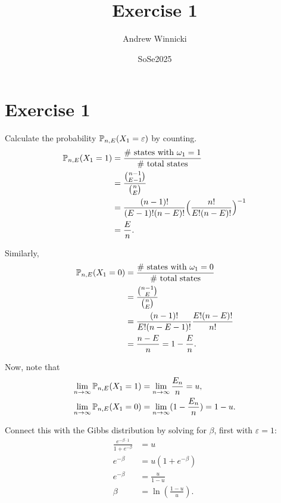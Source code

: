 \documentclass{article}
\title{Exercise 1}
\author{Andrew Winnicki}
\date{SoSe2025}
\begin{document}
\maketitle

\tableofcontents

\section{Exercise 1}

Calculate the probability $\mathbb{P}_{n,E}(X_1 = \varepsilon)$ by counting.
\begin{align}
  \mathbb{P}_{n,E}(X_1 = 1) &= \frac{\# \text{ states with } \omega_1 = 1}{\# \text{ total states}} \\
                     &= \frac{{n - 1 \choose E - 1}}{{n \choose E}} \\
                     &= \frac{(n-1)!}{(E - 1)! (n - E)!} \Big( \frac{n!}{E! (n - E)!} \Big)^{-1} \\
  &= \frac{E}{n}.
\end{align}

Similarly,
\begin{align}
  \mathbb{P}_{n, E}(X_1 = 0) &= \frac{\# \text{ states with } \omega_1 = 0}{\# \text{ total states}} \\
                      &= \frac{{n - 1 \choose E}}{{n \choose E}} \\
                      &= \frac{(n - 1)!}{E!(n - E - 1)!} \frac{E! (n - E)!}{n!} \\
  &= \frac{n - E}{n} = 1 - \frac{E}{n}.
\end{align}

Now, note that
\begin{align}
  \lim_{n \rightarrow \infty} \mathbb{P}_{n,E}(X_1 = 1) &= \lim_{n \rightarrow \infty} \frac{E_n}{n} = u, \\
  \lim_{n \rightarrow \infty} \mathbb{P}_{n, E}(X_1 = 0) &= \lim_{n \rightarrow \infty} (1 - \frac{E_n}{n}) = 1 - u.
\end{align}

Connect this with the Gibbs distribution by solving for $\beta$, first with $\varepsilon = 1$:
\begin{align}
  \frac{e^{-\beta \cdot 1}}{1 + e^{-\beta}} &= u \\
  e^{-\beta} &= u ( 1 + e^{-\beta}) \\
  e^{-\beta} &= \frac{u}{1 - u} \\
  \beta &= \ln\left(\frac{1-u}{u}\right).
\end{align}
\end{document}
